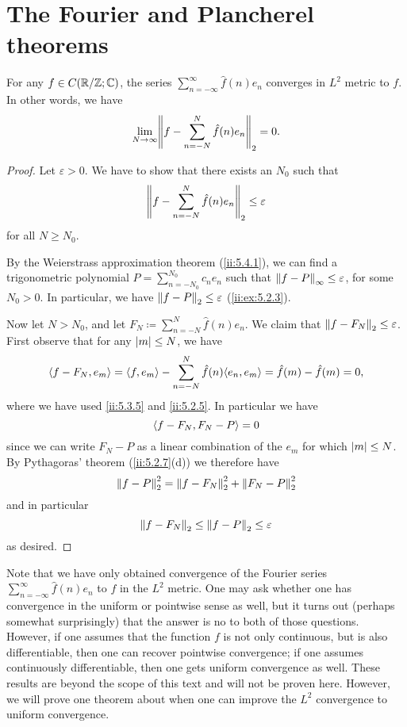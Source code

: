 \section{The Fourier and Plancherel theorems}\label{ii:sec:5.5}

\begin{thm}\label{ii:5.5.1}
  For any \(f \in C(\R / \Z ; \C)\), the series \(\sum_{n = -\infty}^\infty \hat{f}(n) e_n\) converges in \(L^2\) metric to \(f\).
  In other words, we have
  \[
    \lim_{N \to \infty} \norm*{f - \sum_{n = -N}^N \hat{f}(n) e_n}_2 = 0.
  \]
\end{thm}

\begin{proof}
  Let \(\varepsilon > 0\).
  We have to show that there exists an \(N_0\) such that
  \[
    \norm*{f - \sum_{n = -N}^N \hat{f}(n) e_n}_2 \leq \varepsilon
  \]
  for all \(N \geq N_0\).

  By the Weierstrass approximation theorem (\cref{ii:5.4.1}), we can find a trigonometric polynomial \(P = \sum_{n = -N_0}^{N_0} c_n e_n\) such that \(\norm*{f - P}_{\infty} \leq \varepsilon\), for some \(N_0 > 0\).
  In particular, we have \(\norm*{f - P}_2 \leq \varepsilon\) (\cref{ii:ex:5.2.3}).

  Now let \(N > N_0\), and let \(F_N \coloneqq \sum_{n = -N}^N \hat{f}(n) e_n\).
  We claim that \(\norm*{f - F_N}_2 \leq \varepsilon\).
  First observe that for any \(\abs{m} \leq N\), we have
  \[
    \inner*{f - F_N, e_m} = \inner*{f, e_m} - \sum_{n = -N}^N \hat{f}(n) \inner*{e_n, e_m} = \hat{f}(m) - \hat{f}(m) = 0,
  \]
  where we have used \cref{ii:5.3.5} and \cref{ii:5.2.5}.
  In particular we have
  \[
    \inner*{f - F_N, F_N - P} = 0
  \]
  since we can write \(F_N - P\) as a linear combination of the \(e_m\) for which \(\abs{m} \leq N\).
  By Pythagoras' theorem (\cref{ii:5.2.7}(d)) we therefore have
  \[
    \norm*{f - P}_2^2 = \norm*{f - F_N}_2^2 + \norm*{F_N - P}_2^2
  \]
  and in particular
  \[
    \norm*{f - F_N}_2 \leq \norm*{f - P}_2 \leq \varepsilon
  \]
  as desired.
\end{proof}

\begin{rmk}\label{ii:5.5.2}
  Note that we have only obtained convergence of the Fourier series \(\sum_{n = -\infty}^\infty \hat{f}(n) e_n\) to \(f\) in the \(L^2\) metric.
  One may ask whether one has convergence in the uniform or pointwise sense as well, but it turns out (perhaps somewhat surprisingly) that the answer is no to both of those questions.
  However, if one assumes that the function \(f\) is not only continuous, but is also differentiable, then one can recover pointwise convergence;
  if one assumes continuously differentiable, then one gets uniform convergence as well.
  These results are beyond the scope of this text and will not be proven here.
  However, we will prove one theorem about when one can improve the \(L^2\) convergence to uniform convergence.
\end{rmk}

